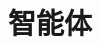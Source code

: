 \setcounter{chapter}{21}

\hypertarget{ux667aux80fdux4f53}{%
\chapter{智能体}\label{ux667aux80fdux4f53}}

